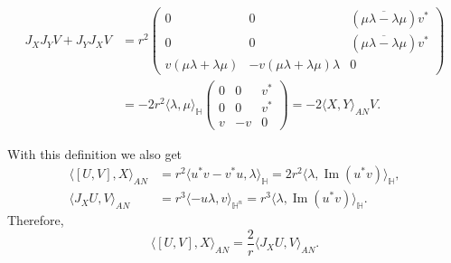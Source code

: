 \documentclass[12pt, a4paper]{amsart}
\renewcommand{\H}{\mathbb{H}}
\renewcommand{\Im}{\operatorname{Im}}
\theoremstyle{remark}
\begin{document}
\[
\begin{aligned}
J_X J_Y V+J_Y J_X V
&{}=r^2\left(
\begin{array}{cc|c}
	0 & 0 & (\overline{\mu\lambda-\lambda\mu})v^{*} \\
	0 & 0 & (\overline{\mu\lambda-\lambda\mu})v^{*} \\
	\hline
	v(\mu\lambda+\lambda\mu) & -v(\mu\lambda+\lambda\mu)\lambda & 0
\end{array}
\right)\\
&{}=-2r^2\langle\lambda,\mu\rangle_{\H} \left(
\begin{array}{cc|c}
	0 & 0 & v^{*} \\
	0 & 0 & v^{*} \\
	\hline
	v  & -v & 0
\end{array}
\right)
=-2\langle X,Y\rangle_{AN} V.
\end{aligned}
\]

With this definition we also get
\[
\begin{aligned}
\langle[U,V],X\rangle_{AN}
&{}=r^2\langle u^*v-v^*u,\lambda\rangle_{\H}
=2r^2\langle\lambda,\Im(u^*v)\rangle_\H,\\
\langle J_X U,V\rangle_{AN}
&{}=r^3\langle -u\lambda,v\rangle_{\H^n}
=r^3\langle\lambda,\Im(u^*v)\rangle_\H.
\end{aligned}
\]
Therefore,
\[
\langle[U,V],X\rangle_{AN}=\frac{2}{r}\langle J_X U,V\rangle_{AN}.
\]
\end{document}
